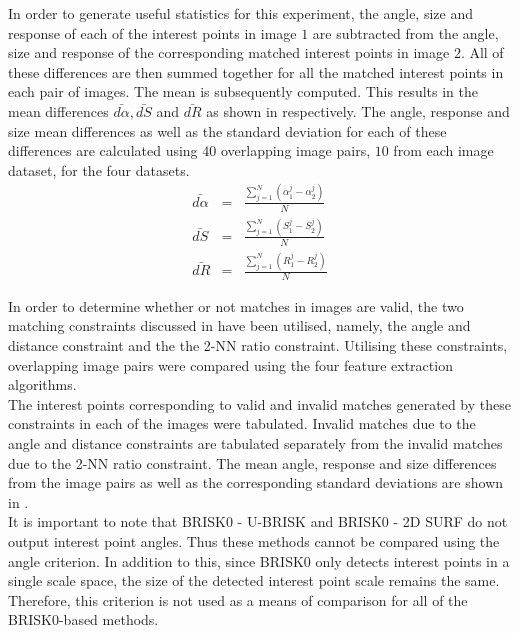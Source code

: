 \documentclass[11pt]{report}
\begin{document}
In order to generate useful statistics for this experiment, the angle, size and response of each of the interest points in image $1$ are subtracted from the angle, size and response of the corresponding matched interest points in image $2$. All of these differences are then summed together for all the matched interest points in each pair of images. The mean is subsequently computed. This results in the mean differences $\bar{d\alpha}, \bar{dS}$ and $\bar{dR}$ as shown in  respectively. The angle, response and size mean differences as well as the standard deviation for each of these differences are calculated using $40$ overlapping image pairs, $10$ from each image dataset, for the four datasets.\\

\begin{eqnarray}
\bar{d\alpha} &=& \frac{\sum_{j=1}^N (\alpha_1^j - \alpha_2^j)}{N}\\
\bar{dS} &=& \frac{\sum_{j=1}^N (S_1^j - S_2^j)}{N}\\
\bar{dR} &=& \frac{\sum_{j=1}^N (R_1^j - R_2^j)}{N}
\label{eqn:differenceProperties}
\end{eqnarray}

In order to determine whether or not matches in images are valid, the two matching constraints discussed in  have been utilised, namely, the angle and distance constraint and the the 2-NN ratio constraint. Utilising these constraints, overlapping image pairs were compared using the four feature extraction algorithms. \\

The interest points corresponding to valid and invalid matches generated by these constraints in each of the images were tabulated. Invalid matches due to the angle and distance constraints are tabulated separately from the invalid matches due to the 2-NN ratio constraint. The mean angle, response and size differences from the image pairs as well as the corresponding standard deviations are shown in .\\

It is important to note that BRISK0 - U-BRISK and BRISK0 - 2D SURF do not output interest point angles. Thus these methods cannot be compared using the angle criterion. In addition to this, since BRISK0 only detects interest points in a single scale space, the size of the detected interest point scale remains the same. Therefore, this criterion is not used as a means of comparison for all of the BRISK0-based methods.\\
\end{document}
